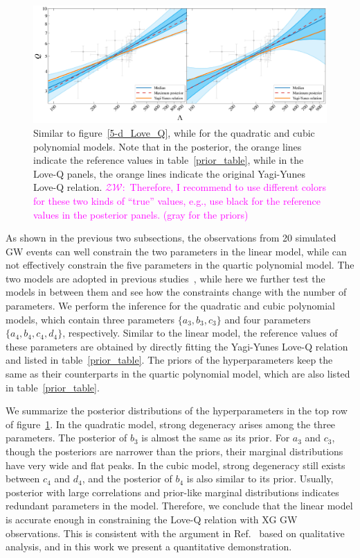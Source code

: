 \documentclass[a4paper,11pt]{article}
\newcommand{\ZW}[1]{\textcolor{magenta}{$\mathcal{ZW}$:~#1}}
\begin{document}
\begin{figure}[t]
    \begin{minipage}[t]{\textwidth}
    \includegraphics[width=\linewidth]{hierarchical_results_APR4_3d.pdf}
    \end{minipage}
    \caption{Similar to figure~\ref{5-d_Love_Q}, while for the quadratic and
    cubic polynomial models. Note that in the posterior, the orange lines
    indicate
    the reference values in table~\ref{prior_table}, while in the Love-Q
    panels, the orange lines indicate the original Yagi-Yunes Love-Q relation.
    \ZW{Therefore, I recommend to use different colors for these two kinds of
    ``true'' values, e.g., use black for the reference values in the posterior
    panels. (gray for the priors)}
    }\label{3-d_4-d_Love_Q}
\end{figure}
As shown in the previous two subsections, the observations from 20 simulated GW 
events can well constrain the two parameters in the linear model, while can not 
effectively constrain the five parameters in the quartic polynomial model. The two 
models are adopted in previous studies~\cite{Yagi:2013awa, Samajdar:2020xrd}, 
while here we further test the models in between them and see how the constraints 
change with the number of parameters. We perform the inference for the quadratic 
and cubic polynomial models, which contain three parameters $\{a_3, b_3, c_3\}$ 
and four parameters $\{a_4, b_4, c_4, d_4\}$, respectively. Similar to the linear 
model, the reference values of these parameters are obtained by directly fitting 
the Yagi-Yunes Love-Q relation and listed in table~\ref{prior_table}. The priors of the
hyperparameters keep the same as their counterparts in the quartic polynomial 
model, which are also listed in table~\ref{prior_table}.

We summarize the posterior distributions of the hyperparameters in the top row of 
figure~\ref{3-d_4-d_Love_Q}. In the quadratic model, strong degeneracy arises 
among the three parameters. The posterior of $b_3$ is almost the same as its 
prior. For $a_3$ and $c_3$, though the posteriors are narrower than the priors, 
their marginal distributions have very wide and flat peaks. In the cubic model, 
strong degeneracy still exists between $c_4$ and $d_4$, and the posterior of $b_4$ 
is also similar to its prior. Usually, posterior with large correlations and 
prior-like marginal distributions indicates redundant parameters in the model. 
Therefore, we conclude that the linear model is accurate enough in constraining 
the Love-Q relation with XG GW observations. This is consistent with the argument 
in Ref.~\cite{Samajdar:2020xrd} based on qualitative analysis, and in this work we present a quantitative demonstration. 
\end{document}
